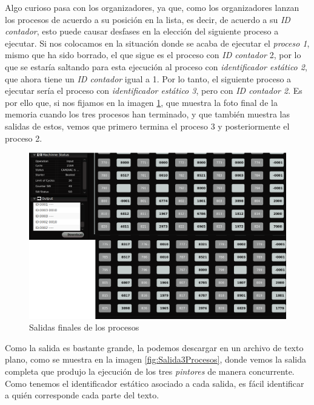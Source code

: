 \documentclass[letterpaper,12pt,oneside]{book}
\begin{document}
		Algo curioso pasa con los organizadores, ya que, como  los organizadores lanzan los procesos de acuerdo a su posición en la lista, es decir,
		de acuerdo a su \textit{ID contador}, esto puede causar desfases en la elección del siguiente proceso a ejecutar. 
		Si nos colocamos en la situación donde se acaba de ejecutar el \textit{proceso 1}, mismo que ha sido borrado, el que sigue es el proceso
		con \textit{ID contador} 2, por lo que se estaría saltando para esta ejecución al proceso 
		con \textit{identificador estático 2}, que ahora tiene un \textit{ID contador} igual a
		1. Por lo tanto, el siguiente proceso a ejecutar sería el proceso con \textit{identificador estático 3}, pero con \textit{ID contador 2}.
		Es por ello que, si nos fijamos en la imagen \ref{fig:FinalProcesos}, que muestra
		la foto final de la memoria cuando los tres procesos han terminado, y que también muestra las salidas de estos, vemos que
		primero termina el proceso 3 y posteriormente  el proceso 2.
		
		\begin{figure}[h]		
			\centering
			\includegraphics[scale=0.38]{media/CARDIACC/FinalProcesos_cut.png}
			\caption{ Salidas finales de los procesos}
			\label{fig:FinalProcesos}
		\end{figure}
		
		Como la salida es bastante grande, la podemos descargar en un archivo de texto plano, como se muestra en la imagen \ref{fig:Salida3Procesos}, 
		donde
		vemos la salida completa que produjo la ejecución de los tres \textit{pintores} de manera concurrente. Como tenemos el identificador estático 
		asociado a cada salida, es fácil identificar a quién corresponde cada parte del texto.
		
\end{document}
